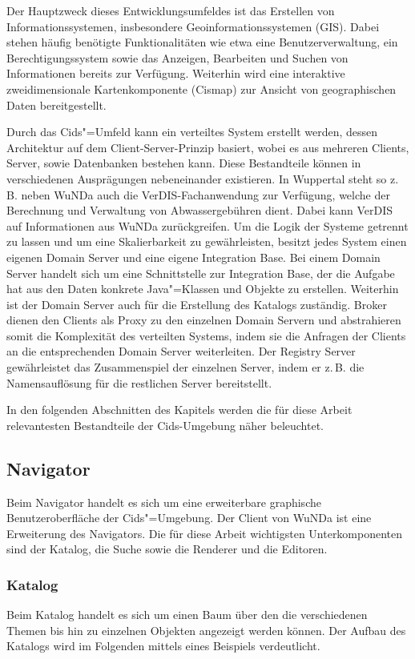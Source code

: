 Der Hauptzweck dieses Entwicklungsumfeldes ist das Erstellen von Informationssystemen, insbesondere Geoinformationssystemen (\acs{GIS}).
Dabei stehen häufig benötigte Funktionalitäten wie etwa eine Benutzerverwaltung, ein Berechtigungssystem sowie das Anzeigen, Bearbeiten und Suchen von Informationen bereits zur Verfügung.
Weiterhin wird eine interaktive zweidimensionale Kartenkomponente (Cismap) zur Ansicht von geographischen Daten bereitgestellt.

Durch das Cids"=Umfeld kann ein verteiltes System erstellt werden, dessen Architektur auf dem Client-Server-Prinzip basiert, wobei es aus mehreren Clients, Server, sowie Datenbanken bestehen kann.
Diese Bestandteile können in verschiedenen Ausprägungen nebeneinander existieren.
In Wuppertal steht so z.\,B. neben \ac{WuNDa} auch die VerDIS-Fachanwendung zur Verfügung, welche der Berechnung und Verwaltung von Abwassergebühren dient.
Dabei kann VerDIS auf Informationen aus \ac{WuNDa} zurückgreifen.
Um die Logik der Systeme getrennt zu lassen und um eine Skalierbarkeit zu gewährleisten, besitzt jedes System einen eigenen Domain Server und eine eigene Integration Base.
Bei einem Domain Server handelt sich um eine Schnittstelle zur Integration Base, der die Aufgabe hat aus den Daten konkrete Java"=Klassen und Objekte zu erstellen. Weiterhin ist der Domain Server auch für die Erstellung des Katalogs zuständig.
Broker dienen den Clients als Proxy zu den einzelnen Domain Servern und abstrahieren somit die Komplexität des verteilten Systems, indem sie die Anfragen der Clients an die entsprechenden Domain Server weiterleiten.
Der Registry Server gewährleistet das Zusammenspiel der einzelnen Server, indem er z.\,B. die Namensauflösung für die restlichen Server bereitstellt.

In den folgenden Abschnitten des Kapitels werden die für diese Arbeit relevantesten Bestandteile der Cids-Umgebung näher beleuchtet.

\subsection{Navigator}
Beim Navigator handelt es sich um eine erweiterbare graphische Benutzeroberfläche der Cids"=Umgebung.
Der Client von \ac{WuNDa} ist eine Erweiterung des Navigators.
Die für diese Arbeit wichtigsten Unterkomponenten sind der Katalog, die Suche sowie die Renderer und die Editoren.

\subsubsection{Katalog} \label{subsubsec:katalog}
Beim Katalog handelt es sich um einen Baum über den die verschiedenen Themen bis hin zu einzelnen Objekten angezeigt werden können.
Der Aufbau des Katalogs wird im Folgenden mittels eines Beispiels verdeutlicht.


